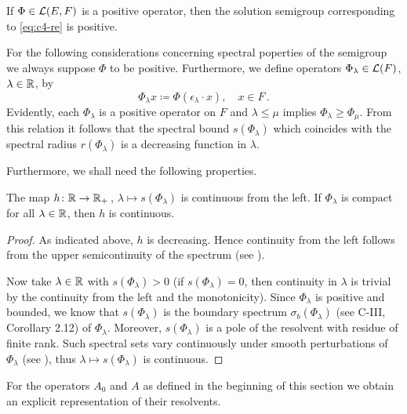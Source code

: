 \begin{proposition}\label{prop:c4-3.3}
%
%
If $\Phi \in \mathcal{L}(E,F)$ is a positive operator, then the solution semigroup corresponding to \eqref{eq:c4-re} is positive.
\end{proposition}
For the following considerations concerning spectral poperties of the semigroup we always suppose $\Phi$ to be positive. Furthermore, we define operators $\Phi_{\lambda} \in \mathcal{L}(F)$, $\lambda \in \mathbb{R}$, by
\begin{equation}\label{eq:c4-3.6}
\Phi_\lambda x \coloneqq \Phi(\epsilon_{\lambda} \cdot x), \quad x \in F\,.
\end{equation}
Evidently, each $\Phi_\lambda$ is a positive operator on $F$ and $\lambda \leq \mu$ implies $\Phi_{\lambda} \geq \Phi_{\mu}$.
From this relation it follows that the spectral bound $s(\Phi_{\lambda})$ which coincides with the spectral radius $r(\Phi_{\lambda})$ is a decreasing function in $\lambda$.

Furthermore, we shall need the following properties.

\begin{lemma}\label{lem:c4-3.4}
%
The map $h \colon \mathbb{R} \to \mathbb{R}_{+}$\,, $\lambda \mapsto s(\Phi_{\lambda})$ is continuous from the left. If $\Phi_{\lambda}$ is compact for all $\lambda \in \mathbb{R}$, then $h$ is continuous.
\end{lemma}
\begin{proof}
As indicated above, $h$ is decreasing. Hence continuity from the left follows from the upper semicontinuity of the spectrum (see \citet[Chapter IV, Theorem~3.1]{kato:1976}).

Now take $\lambda \in \mathbb{R}$ with $s(\Phi_{\lambda}) > 0$ (if $s( \Phi_{\lambda}) = 0$, then continuity in $\lambda$ is trivial by the continuity from the left and the monotonicity). Since $\Phi_{\lambda}$ is positive and bounded, we know that 
$s(\Phi_{\lambda})$ is the boundary spectrum $\sigma_b(\Phi_{\lambda})$ (see C-III, Corollary 2.12) of $\Phi_{\lambda}$. Moreover, $s(\Phi_{\lambda})$ is a pole of the resolvent with residue of finite rank. Such spectral sets vary continuously under smooth perturbations of $\Phi_{\lambda}$ (see \citet[VII.6, Theorem 9]{dunfordschwartz:1958}), thus $\lambda \mapsto s(\Phi_{\lambda})$ is continuous.
\end{proof}
For the operators $A_{0}$ and $A$ as defined in the beginning of this section we obtain an explicit representation of their resolvents.

